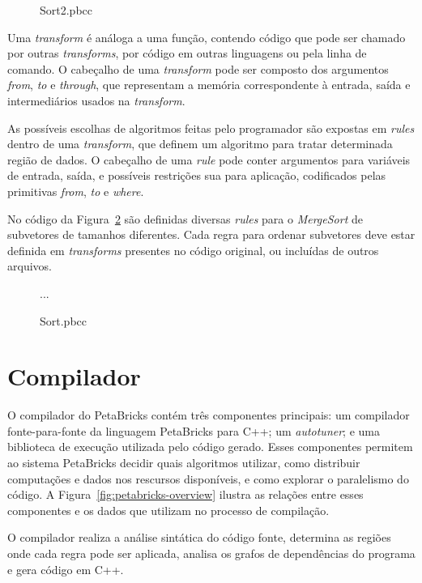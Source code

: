 \documentclass[a4paper, 11pt, twoside]{article}
\begin{document}
\begin{figure}[H]
    \centering
    
    \caption{Sort2.pbcc}
    \label{fig:sort2pbcc}
\end{figure}

Uma \emph{transform} é análoga a uma função, contendo código que pode
ser chamado por outras \emph{transforms}, por código em outras linguagens
ou pela linha de comando. O cabeçalho de uma \emph{transform} pode ser composto
dos argumentos \emph{from}, \emph{to} e \emph{through}, que representam a
memória correspondente à entrada, saída e intermediários usados na 
\emph{transform}.

As possíveis escolhas de algoritmos feitas pelo programador são expostas 
em \emph{rules} dentro de uma \emph{transform}, que definem um algoritmo
para tratar determinada região de dados. O cabeçalho de uma \emph{rule} pode
conter argumentos para variáveis de entrada, saída, e possíveis restrições sua 
para aplicação, codificados pelas primitivas \emph{from}, \emph{to} e 
\emph{where}.

No código da Figura~\ref{fig:sortpbcc} são definidas diversas \emph{rules}
para o \emph{MergeSort} de subvetores de tamanhos diferentes. Cada regra
para ordenar subvetores deve estar definida em \emph{transforms} presentes
no código original, ou incluídas de outros arquivos.

\begin{figure}[H]
    
    ...
    
    \centering
    \caption{Sort.pbcc}
    \label{fig:sortpbcc}
\end{figure}

\section{Compilador}

O compilador do PetaBricks contém três componentes principais: um 
compilador fonte-para-fonte da linguagem PetaBricks para C++; um 
\emph{autotuner}; e uma biblioteca de execução utilizada pelo código gerado.
Esses componentes permitem ao sistema PetaBricks decidir quais algoritmos 
utilizar, como distribuir computações e dados nos rescursos disponíveis, e como
explorar o paralelismo do código. A Figura~\ref{fig:petabricks-overview} 
ilustra as relações entre esses componentes e os dados que utilizam no processo
de compilação.

O compilador realiza a análise sintática do código
fonte, determina as regiões onde cada regra pode ser aplicada, analisa
os grafos de dependências do programa e gera código em C++.
\end{document}
